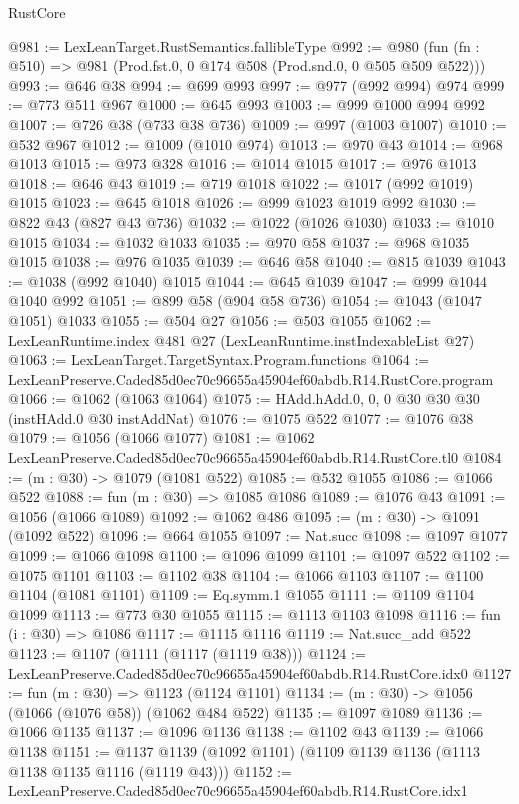 \begin{lexlean}{RustCore}
\begin{coremodule}
@981 := LexLeanTarget.RustSemantics.fallibleType
@992 := @980 (fun (fn : @510) => @981 (Prod.fst.{0, 0} @174 @508 (Prod.snd.{0, 0} @505 @509 @522)))
@993 := @646 @38
@994 := @699 @993
@997 := @977 (@992 @994) @974
@999 := @773 @511 @967
@1000 := @645 @993
@1003 := @999 @1000 @994 @992
@1007 := @726 @38 (@733 @38 @736)
@1009 := @997 (@1003 @1007)
@1010 := @532 @967
@1012 := @1009 (@1010 @974)
@1013 := @970 @43
@1014 := @968 @1013
@1015 := @973 @328
@1016 := @1014 @1015
@1017 := @976 @1013
@1018 := @646 @43
@1019 := @719 @1018
@1022 := @1017 (@992 @1019) @1015
@1023 := @645 @1018
@1026 := @999 @1023 @1019 @992
@1030 := @822 @43 (@827 @43 @736)
@1032 := @1022 (@1026 @1030)
@1033 := @1010 @1015
@1034 := @1032 @1033
@1035 := @970 @58
@1037 := @968 @1035 @1015
@1038 := @976 @1035
@1039 := @646 @58
@1040 := @815 @1039
@1043 := @1038 (@992 @1040) @1015
@1044 := @645 @1039
@1047 := @999 @1044 @1040 @992
@1051 := @899 @58 (@904 @58 @736)
@1054 := @1043 (@1047 @1051) @1033
@1055 := @504 @27
@1056 := @503 @1055
@1062 := LexLeanRuntime.index @481 @27 (LexLeanRuntime.instIndexableList @27)
@1063 := LexLeanTarget.TargetSyntax.Program.functions
@1064 := LexLeanPreserve.Caded85d0ec70c96655a45904ef60abdb.R14.RustCore.program
@1066 := @1062 (@1063 @1064)
@1075 := HAdd.hAdd.{0, 0, 0} @30 @30 @30 (instHAdd.{0} @30 instAddNat)
@1076 := @1075 @522
@1077 := @1076 @38
@1079 := @1056 (@1066 @1077)
@1081 := @1062 LexLeanPreserve.Caded85d0ec70c96655a45904ef60abdb.R14.RustCore.tl0
@1084 := (m : @30) -> @1079 (@1081 @522)
@1085 := @532 @1055
@1086 := @1066 @522
@1088 := fun (m : @30) => @1085 @1086
@1089 := @1076 @43
@1091 := @1056 (@1066 @1089)
@1092 := @1062 @486
@1095 := (m : @30) -> @1091 (@1092 @522)
@1096 := @664 @1055
@1097 := Nat.succ
@1098 := @1097 @1077
@1099 := @1066 @1098
@1100 := @1096 @1099
@1101 := @1097 @522
@1102 := @1075 @1101
@1103 := @1102 @38
@1104 := @1066 @1103
@1107 := @1100 @1104 (@1081 @1101)
@1109 := Eq.symm.{1} @1055
@1111 := @1109 @1104 @1099
@1113 := @773 @30 @1055
@1115 := @1113 @1103 @1098
@1116 := fun (i : @30) => @1086
@1117 := @1115 @1116
@1119 := Nat.succ_add @522
@1123 := @1107 (@1111 (@1117 (@1119 @38)))
@1124 := LexLeanPreserve.Caded85d0ec70c96655a45904ef60abdb.R14.RustCore.idx0
@1127 := fun (m : @30) => @1123 (@1124 @1101)
@1134 := (m : @30) -> @1056 (@1066 (@1076 @58)) (@1062 @484 @522)
@1135 := @1097 @1089
@1136 := @1066 @1135
@1137 := @1096 @1136
@1138 := @1102 @43
@1139 := @1066 @1138
@1151 := @1137 @1139 (@1092 @1101) (@1109 @1139 @1136 (@1113 @1138 @1135 @1116 (@1119 @43)))
@1152 := LexLeanPreserve.Caded85d0ec70c96655a45904ef60abdb.R14.RustCore.idx1

\end{coremodule}
\end{lexlean}
